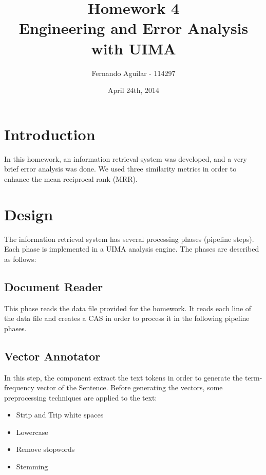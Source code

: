 \documentclass{article}
\title{Homework 4 \\ Engineering and Error Analysis with UIMA}
\author{Fernando Aguilar - 114297}
\date{April 24th, 2014}
\begin{document}
\maketitle

\section{Introduction}
In this homework, an information retrieval system was developed, and a very brief error analysis was done. We used three similarity metrics in order to enhance the mean reciprocal rank (MRR).
\section{Design}
The information retrieval system has several processing phases (pipeline steps). Each phase is implemented in a UIMA analysis engine. The phases are described as follows:

\subsection{Document Reader}
This phase reads the data file provided for the homework. It reads each line of the data file and creates a CAS in order to process it in the following pipeline phases.

\subsection{Vector Annotator}
In this step, the component extract the text tokens in order to generate the term-frequency vector of the Sentence. Before generating the vectors, some preprocessing techniques are applied to the text:
\begin{itemize}
\item Strip and Trip white spaces
\item Lowercase
\item Remove stopwords
\item Stemming
\end{itemize} 
\end{document}
